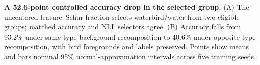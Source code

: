 \textbf{A 52.6-point controlled accuracy drop in the selected group.}
(A) The uncentered feature--Schur fraction selects waterbird/water from two eligible groups; matched accuracy and NLL selectors agree. (B) Accuracy falls from 93.2\% under same-type background recomposition to 40.6\% under opposite-type recomposition, with bird foregrounds and labels preserved. Points show means and bars nominal 95\% normal-approximation intervals across five training seeds.
